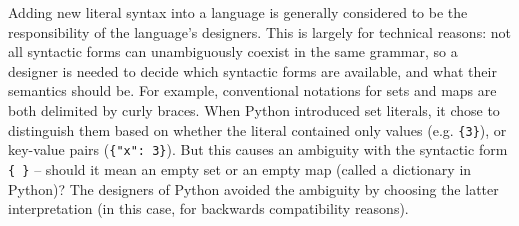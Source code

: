 
Adding new literal syntax into a language is generally considered to be the responsibility of the language's designers. This is largely for technical reasons: not all syntactic forms can unambiguously coexist in the same grammar, so a designer is needed to decide which syntactic forms are available, and what their semantics should be. For example, conventional notations for sets and maps are both delimited by curly braces. When Python introduced set literals, it chose to distinguish them based on whether the literal contained only values (e.g. \verb|{3}|), or key-value pairs (\verb|{"x": 3}|). But this causes an ambiguity with the syntactic form \verb|{ }| -- should it mean an empty set or an empty map (called a dictionary in Python)? The designers of Python avoided the ambiguity by choosing the latter interpretation (in this case, for backwards compatibility reasons).

